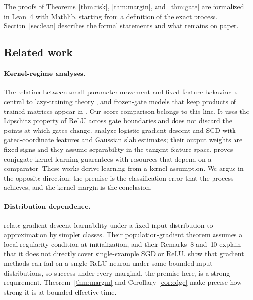 \documentclass[11pt,letterpaper,pmlr,twoside]{jmlr}
\begin{document}
The proofs of Theorems~\ref{thm:risk}, \ref{thm:margin}, and~\ref{thm:gate} are formalized in Lean~4 with Mathlib, starting from a definition of the exact process. Section~\ref{sec:lean} describes the formal statements and what remains on paper.

\subsection{Related work}
\paragraph{Kernel-regime analyses.} The relation between small parameter movement and fixed-feature behavior is central to lazy-training theory \citep{Chizat19}, and frozen-gate models that keep products of trained matrices appear in \citet[Section~6.2]{AllenZhu19}. Our score comparison belongs to this line. It uses the Lipschitz property of ReLU across gate boundaries and does not discard the points at which gates change. \citet{JiT20} analyze logistic gradient descent and SGD with gated-coordinate features and Gaussian slab estimates; their output weights are fixed signs and they assume separability in the tangent feature space. \citet{Daniely17} proves conjugate-kernel learning guarantees with resources that depend on a comparator. These works derive learning from a kernel assumption. We argue in the opposite direction: the premise is the classification error that the process achieves, and the kernel margin is the conclusion.

\paragraph{Distribution dependence.} \citet{Malach21} relate gradient-descent learnability under a fixed input distribution to approximation by simpler classes. Their population-gradient theorem assumes a local regularity condition at initialization, and their Remarks~8 and~10 explain that it does not directly cover single-example SGD or ReLU. \citet{Yehudai20} show that gradient methods can fail on a single ReLU neuron under some bounded input distributions, so success under every marginal, the premise here, is a strong requirement. Theorem~\ref{thm:margin} and Corollary~\ref{cor:edge} make precise how strong it is at bounded effective time.
\end{document}
